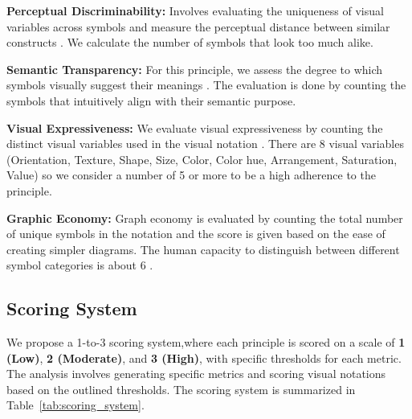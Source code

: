 \documentclass[runningheads]{llncs}
\begin{document}
\textbf{Perceptual Discriminability:}
Involves evaluating the uniqueness of visual variables across symbols and measure the perceptual distance between similar constructs \cite{Moody2010}. We calculate the number of symbols that look too much alike.

\textbf{Semantic Transparency:}
For this principle, we assess the degree to which symbols visually suggest their meanings \cite{Moody2010}. The evaluation is done by counting the symbols that intuitively align with their semantic purpose.

\textbf{Visual Expressiveness:}
We evaluate visual expressiveness by counting the distinct visual variables used in the visual notation \cite{Moody2010}. There are 8 visual variables (Orientation, Texture, Shape, Size, Color, Color hue, Arrangement, Saturation, Value) \cite{Moody2008} so we consider a number of 5 or more to be a high adherence to the principle. 

\textbf{Graphic Economy:}
Graph economy is evaluated by counting the total number of unique symbols in the notation and the score is given based on the ease of creating simpler diagrams. The human capacity to distinguish between different symbol categories is about 6 \cite{Miller1956}.

\subsection{Scoring System}
We propose a 1-to-3 scoring system,where each principle is scored on a scale of \textbf{1 (Low)}, \textbf{2 (Moderate)}, and \textbf{3 (High)}, with specific thresholds for each metric. The analysis involves generating specific metrics and scoring visual notations based on the outlined thresholds. The scoring system is summarized in Table~\ref{tab:scoring_system}.
\end{document}

